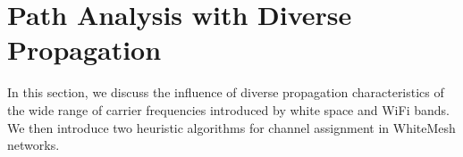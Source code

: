 \section{Path Analysis with Diverse Propagation}
\label{sec:wmalgorithms}


In this section, we discuss the influence of diverse propagation
characteristics of the wide range of carrier frequencies introduced
by white space and WiFi bands. We then introduce two heuristic
algorithms for channel assignment in WhiteMesh networks.




